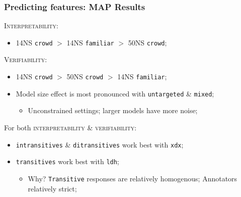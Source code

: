 \documentclass[handout,xcolor={dvipsnames}]{beamer}
\newcommand{\feat}[1]{\textsc{#1}}
\newcommand{\param}[1]{\texttt{#1}}
\begin{document}
\begin{frame}
\frametitle{Predicting features: MAP Results}
\vspace{-.5em}
\pause
\feat{Interpretability}:
\begin{itemize}
\pause
\item 14NS \param{crowd} $>$ 14NS \param{familiar} $>$ 50NS \param{crowd};
\end{itemize}

\vspace{1em}

\pause
\feat{Verifiability}:
\begin{itemize}
\pause
\item 14NS \param{crowd} $>$ 50NS \param{crowd} $>$ 14NS \param{familiar};
\pause
\item Model size effect is most pronounced with \param{untargeted} \& \param{mixed};
\begin{itemize}
\pause
\item Unconstrained settings; larger models have more noise;
\end{itemize}
\end{itemize}

\vspace{1em}

\pause
For both \feat{interpretability} \& \feat{verifiability}:
\begin{itemize}
\pause
\item \param{intransitives} \& \param{ditransitives} work best with \param{xdx};
\pause
\item \param{transitives} work best with \param{ldh};
\begin{itemize}
\pause
\item Why? \param{Transitive} responses are relatively homogenous; Annotators relatively strict;
\end{itemize}
\end{itemize}
\end{frame}
\end{document}
